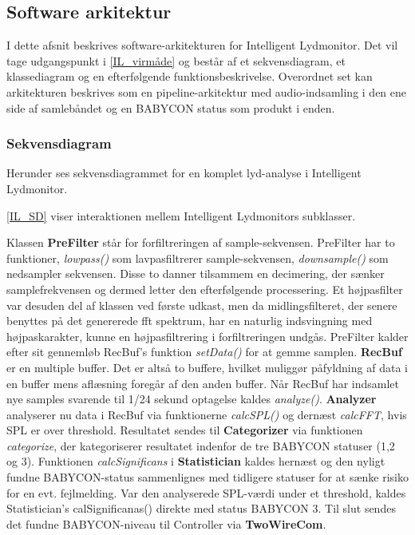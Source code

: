 \newpage
\subsection{Software arkitektur}
I dette afsnit beskrives software-arkitekturen for Intelligent Lydmonitor. Det vil tage udgangspunkt i \ref{IL_virmåde} og består af et sekvensdiagram, et klassediagram og en efterfølgende funktionsbeskrivelse. Overordnet set kan arkitekturen beskrives som en pipeline-arkitektur med audio-indsamling i den ene side af samlebåndet og en BABYCON status som produkt i enden.

\subsubsection*{Sekvensdiagram}
Herunder ses sekvensdiagrammet for en komplet lyd-analyse i Intelligent Lydmonitor.

\ref{IL_SD} viser interaktionen mellem Intelligent Lydmonitors subklasser.

Klassen \textbf{PreFilter} står for forfiltreringen af sample-sekvensen. PreFilter har to funktioner, \textit{lowpass()} som lavpasfiltrerer sample-sekvensen, \textit{downsample()} som nedsampler sekvensen. Disse to danner tilsammem en decimering, der sænker samplefrekvensen og dermed letter den efterfølgende processering. Et højpasfilter var desuden del af klassen ved første udkast, men da midlingsfilteret, der senere benyttes på det genererede fft spektrum, har en naturlig indsvingning med højpaskarakter, kunne en højpasfiltrering i forfiltreringen undgås. PreFilter kalder efter sit gennemløb RecBuf's funktion \textit{setData()} for at gemme samplen.
\textbf{RecBuf} er en multiple buffer. Det er altså to buffere, hvilket muliggør påfyldning af data i en buffer mens aflæsning foregår af den anden buffer. Når RecBuf har indsamlet nye samples svarende til 1/24 sekund optagelse kaldes \textit{analyze()}. \textbf{Analyzer} analyserer nu data i RecBuf via funktionerne \textit{calcSPL()} og dernæst \textit{calcFFT}, hvis SPL er over threshold. Resultatet sendes til \textbf{Categorizer} via funktionen \textit{categorize}, der kategoriserer resultatet indenfor de tre BABYCON statuser (1,2 og 3). Funktionen \textit{calcSignificans} i \textbf{Statistician} kaldes hernæst og den nyligt fundne BABYCON-status sammenlignes med tidligere statuser for at sænke risiko for en evt. fejlmelding. Var den analyserede SPL-værdi under et threshold, kaldes Statistician's calSignificanas() direkte med status BABYCON 3. Til slut sendes det fundne BABYCON-niveau til Controller via \textbf{TwoWireCom}. 

